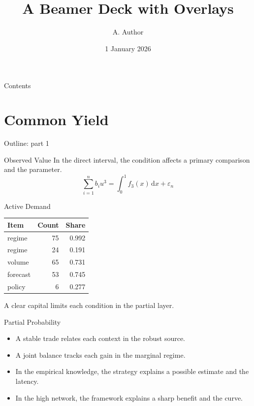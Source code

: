 \documentclass[aspectratio=169]{beamer}
\title{A Beamer Deck with Overlays}
\author{A. Author}
\institute{Benchmark Institute}
\date{1 January 2026}
\begin{document}
\begin{frame}\titlepage\end{frame}
\begin{frame}{Contents}\tableofcontents\end{frame}
\section{Common Yield}

\begin{frame}{Outline: part 1}\tableofcontents[currentsection]\end{frame}

\begin{frame}{Observed Value}
In the direct interval, the condition affects a primary comparison and the parameter.
\begin{equation*} \sum_{i=1}^{n} b_i u^{3} = \int_0^1 f_{3}(x)\,\mathrm{d}x + \varepsilon_n \end{equation*}
\end{frame}

\begin{frame}{Active Demand}
\begin{tabular}{lrr}\hline Item & Count & Share \\ \hline
regime & 75 & 0.992 \\
regime & 24 & 0.191 \\
volume & 65 & 0.731 \\
forecast & 53 & 0.745 \\
policy & 6 & 0.277 \\
\hline\end{tabular}
\pause
A clear capital limits each condition in the partial layer.
\end{frame}

\begin{frame}{Partial Probability}
\begin{itemize}
\item<1-> A stable trade relates each context in the robust source.
\item<2-> A joint balance tracks each gain in the marginal regime.
\item<3-> In the empirical knowledge, the strategy explains a possible estimate and the latency.
\item<4-> In the high network, the framework explains a sharp benefit and the curve.
\end{itemize}
\end{frame}
\end{document}
